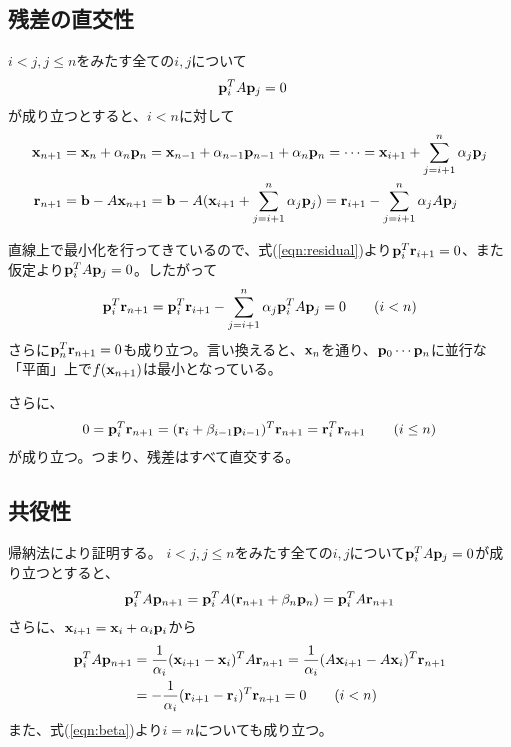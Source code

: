 \documentclass[11pt]{jarticle}
\begin{document}
\subsection{残差の直交性}

$i < j, j \le n$をみたす全ての$i,j$について
\begin{align}
  {\bf p}_i^T A {\bf p}_j &= 0
\end{align}
が成り立つとすると、$i<n$に対して
\begin{align}
  {\bf x}_{n+1} &= {\bf x}_n + \alpha_n {\bf p}_n
  = {\bf x}_{n-1} + \alpha_{n-1} {\bf p}_{n-1} + \alpha_n {\bf p}_n = \cdots
  = {\bf x}_{i+1} + \sum_{j=i+1}^n \alpha_{j} {\bf p}_j \\
  {\bf r}_{n+1} &= {\bf b} - A {\bf x}_{n+1} = {\bf b} - A ({\bf x}_{i+1} + \sum_{j=i+1}^n \alpha_{j} {\bf p}_j)
  = {\bf r}_{i+1} - \sum_{j=i+1}^n \alpha_{j} A {\bf p}_j
\end{align}

直線上で最小化を行ってきているので、式(\ref{eqn:residual})より${\bf p}_i^T  {\bf r}_{i+1} = 0$、また仮定より${\bf p}_i^T A {\bf p}_j = 0$。したがって
\begin{align}
  {\bf p}_i^T {\bf r}_{n+1} = {\bf p}_i^T {\bf r}_{i+1} - \sum_{j=i+1}^n \alpha_{j} {\bf p}_i^T A {\bf p}_j = 0 \qquad (i < n)
\end{align}
さらに${\bf p}_n^T  {\bf r}_{n+1} = 0$も成り立つ。言い換えると、${\bf x}_n$を通り、${\bf p}_0 \cdots {\bf p}_n$に並行な「平面」上で$f({\bf x}_{n+1})$は最小となっている。

さらに、
\begin{align}
  0 = {\bf p}_i^T {\bf r}_{n+1} = ({\bf r}_i + \beta_{i-1} {\bf p}_{i-1})^T {\bf r}_{n+1} = {\bf r}_i^T {\bf r}_{n+1} \qquad (i \le n)
\end{align}
が成り立つ。つまり、残差はすべて直交する。

\subsection{共役性}

帰納法により証明する。
$i < j, j \le n$をみたす全ての$i,j$について${\bf p}_i^T A {\bf p}_j = 0$が成り立つとすると、
\begin{align}
  {\bf p}_i^T A {\bf p}_{n+1} = {\bf p}_i^T A ({\bf r}_{n+1} + \beta_n {\bf p}_n) = {\bf p}_i^T A {\bf r}_{n+1}
\end{align}
さらに、${\bf x}_{i+1} = {\bf x}_i + \alpha_i {\bf p}_i$から
\begin{align}
  {\bf p}_i^T A {\bf p}_{n+1} &= \frac{1}{\alpha_i} ({\bf x}_{i+1} - {\bf x}_i)^T A {\bf r}_{n+1} = \frac{1}{\alpha_i} (A{\bf x}_{i+1} - A{\bf x}_i)^T {\bf r}_{n+1} \\ &= -\frac{1}{\alpha_i} ({\bf r}_{i+1} - {\bf r}_i)^T {\bf r}_{n+1} = 0 \qquad (i < n)
\end{align}
また、式(\ref{eqn:beta})より$i=n$についても成り立つ。
\end{document}
